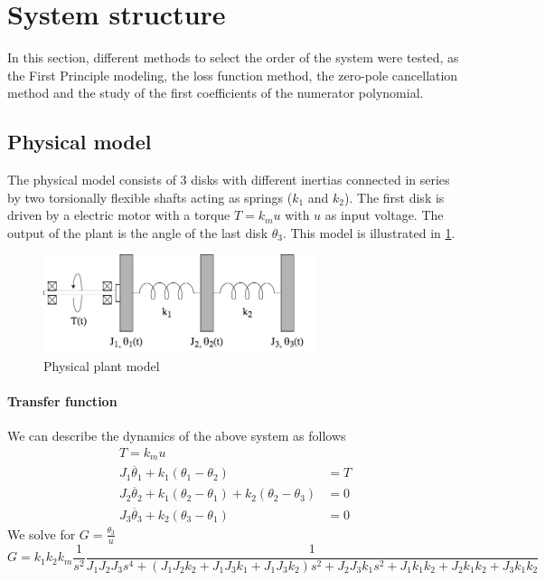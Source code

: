 \documentclass[a4paper,11pt]{article}
\begin{document}
\section{System structure}

In this section, different methods to select the order of the system were tested, as the First Principle modeling, the loss function method, the zero-pole cancellation method and the study of the first coefficients of the numerator polynomial.

\subsection{Physical model}
The physical model consists of 3 disks with different inertias connected in series by two torsionally flexible shafts acting as springs ($k_1$ and $k_2$). The first disk is driven by a electric motor with a torque $T = k_m u$ with $u$ as input voltage. The output of the plant is the angle of the last disk $\theta_3$. This model is illustrated in \ref{fig:plantmodel}.

\begin{figure}[H]
\centering
\includegraphics[width = 8cm]{images/plantmodel}
\caption{Physical plant model}
\label{fig:plantmodel}
\end{figure}

\paragraph{Transfer function}
We can describe the dynamics of the above system as follows
\begin{align}
T = k_m u \\
J_1\ddot{\theta_1} + k_1(\theta_1 - \theta_2) &= T \\
J_2\ddot{\theta_2} + k_1(\theta_2 - \theta_1) + k_2(\theta_2 - \theta_3) &= 0 \\
J_3\ddot{\theta_3} + k_2(\theta_3 - \theta_1) &= 0
\end{align}
We solve for $G = \frac{\theta_3}{u}$
\begin{equation}
G =
k_1 k_2 k_m  \frac{1}{s^2}\frac{1}{J_1 J_2 J_3 s^4 + (J_1 J_2 k_2  + J_1 J_3 k_1  + J_1 J_3 k_2) s^2 + J_2 J_3 k_1  s^2 + J_1 k_1 k_2  + J_2 k_1 k_2  + J_3 k_1 k_2 }
\end{equation}
\end{document}
